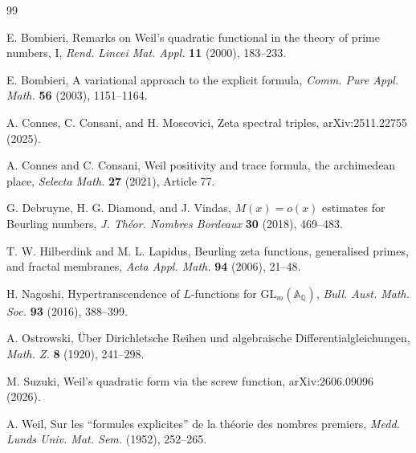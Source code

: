 \documentclass[11pt]{article}
\begin{document}
\begin{thebibliography}{99}

E. Bombieri,
\newblock Remarks on Weil's quadratic functional in the theory of prime
numbers, I,
\newblock \emph{Rend. Lincei Mat. Appl.} \textbf{11} (2000), 183--233.

E. Bombieri,
\newblock A variational approach to the explicit formula,
\newblock \emph{Comm. Pure Appl. Math.} \textbf{56} (2003), 1151--1164.

A. Connes, C. Consani, and H. Moscovici,
\newblock Zeta spectral triples,
\newblock arXiv:2511.22755 (2025).

A. Connes and C. Consani,
\newblock Weil positivity and trace formula, the archimedean place,
\newblock \emph{Selecta Math.} \textbf{27} (2021), Article 77.

G. Debruyne, H. G. Diamond, and J. Vindas,
\newblock \(M(x)=o(x)\) estimates for Beurling numbers,
\newblock \emph{J. Th\'eor. Nombres Bordeaux} \textbf{30} (2018),
469--483.

T. W. Hilberdink and M. L. Lapidus,
\newblock Beurling zeta functions, generalised primes, and fractal
membranes,
\newblock \emph{Acta Appl. Math.} \textbf{94} (2006), 21--48.

H. Nagoshi,
\newblock Hypertranscendence of \(L\)-functions for
\(\mathrm{GL}_m(\mathbb A_{\mathbb Q})\),
\newblock \emph{Bull. Aust. Math. Soc.} \textbf{93} (2016), 388--399.

A. Ostrowski,
\newblock \"Uber Dirichletsche Reihen und algebraische
Differentialgleichungen,
\newblock \emph{Math. Z.} \textbf{8} (1920), 241--298.

M. Suzuki,
\newblock Weil's quadratic form via the screw function,
\newblock arXiv:2606.09096 (2026).

A. Weil,
\newblock Sur les ``formules explicites'' de la th\'eorie des nombres
premiers,
\newblock \emph{Medd. Lunds Univ. Mat. Sem.} (1952), 252--265.

\end{thebibliography}
\end{document}
